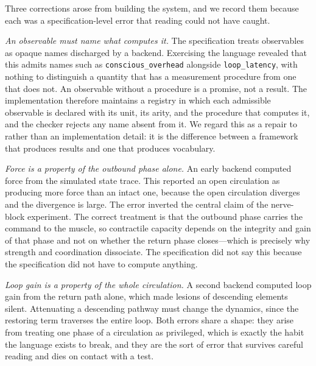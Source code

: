\documentclass[11pt,twocolumn,a4paper]{article}
\theoremstyle{thmstyle}
\theoremstyle{definition}
\theoremstyle{remark}
\begin{document}
Three corrections arose from building the system, and we record them because
each was a specification-level error that reading could not have caught.

\emph{An observable must name what computes it.} The specification treats
observables as opaque names discharged by a backend. Exercising the language
revealed that this admits names such as \texttt{conscious\_overhead}
alongside \texttt{loop\_latency}, with nothing to distinguish a quantity
that has a measurement procedure from one that does not. An observable
without a procedure is a promise, not a result. The implementation therefore
maintains a registry in which each admissible observable is declared with
its unit, its arity, and the procedure that computes it, and the checker
rejects any name absent from it. We regard this as a repair to
 rather than an implementation detail: it is the
difference between a framework that produces results and one that produces
vocabulary.

\emph{Force is a property of the outbound phase alone.} An early backend
computed force from the simulated state trace. This reported an open
circulation as producing more force than an intact one, because the open
circulation diverges and the divergence is large. The error inverted the
central claim of the nerve-block experiment. The correct treatment is that
the outbound phase carries the command to the muscle, so contractile
capacity depends on the integrity and gain of that phase and not on whether
the return phase closes---which is precisely why strength and coordination
dissociate. The specification did not say this because the specification did
not have to compute anything.

\emph{Loop gain is a property of the whole circulation.} A second backend
computed loop gain from the return path alone, which made lesions of
descending elements silent. Attenuating a descending pathway must change the
dynamics, since the restoring term traverses the entire loop. Both errors
share a shape: they arise from treating one phase of a circulation as
privileged, which is exactly the habit the language exists to break, and
they are the sort of error that survives careful reading and dies on contact
with a test.
\end{document}

